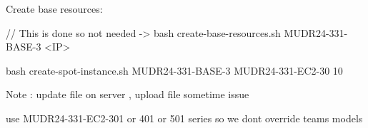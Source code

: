 Create base resources:


// This is done so not needed -> bash create-base-resources.sh MUDR24-331-BASE-3 <IP>

bash create-spot-instance.sh MUDR24-331-BASE-3 MUDR24-331-EC2-30 10

Note : update file on server , upload file sometime issue

use MUDR24-331-EC2-301 or 401 or 501 series so we dont override teams models 